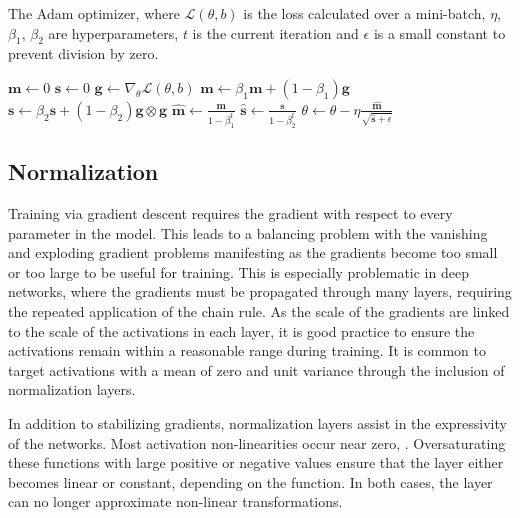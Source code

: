 \begin{algorithm}
\caption{The Adam optimizer, where $\mathcal{L}(\theta, b)$ is the loss calculated over a mini-batch, $\eta$, $\beta_1$, $\beta_2$ are hyperparameters, $t$ is the current iteration and $\epsilon$ is a small constant to prevent division by zero.}
\label{alg:adam}
\begin{algorithmic}[1]
\State $\mathbf{m} \gets 0$ 
\State $\mathbf{s} \gets 0$ 
    \State $\mathbf{g} \gets \nabla_\theta \mathcal{L}(\theta, b)$ 
    \State $\mathbf{m} \gets \beta_1 \mathbf{m} + (1 - \beta_1) \mathbf{g}$ 
    \State $\mathbf{s} \gets \beta_2 \mathbf{s} + (1 - \beta_2) \mathbf{g} \otimes \mathbf{g}$ 
    \State $\hat{\mathbf{m}} \gets \frac{\mathbf{m}}{1 - \beta_1^t}$ 
    \State $\hat{\mathbf{s}} \gets \frac{\mathbf{s}}{1 - \beta_2^t}$ 
    \State $\theta \gets \theta - \eta \frac{\hat{\mathbf{m}}}{\sqrt{\hat{\mathbf{s}} + \epsilon}}$ 
\EndFor
\end{algorithmic}
\end{algorithm}

\subsection{Normalization}

Training via gradient descent requires the gradient with respect to every parameter in the model.
This leads to a balancing problem with the vanishing and exploding gradient problems manifesting as the gradients become too small or too large to be useful for training.
This is especially problematic in deep networks, where the gradients must be propagated through many layers, requiring the repeated application of the chain rule.
As the scale of the gradients are linked to the scale of the activations in each layer, it is good practice to ensure the activations remain within a reasonable range during training.
It is common to target activations with a mean of zero and unit variance through the inclusion of normalization layers.

In addition to stabilizing gradients, normalization layers assist in the expressivity of the networks.
Most activation non-linearities occur near zero, .
Oversaturating these functions with large positive or negative values ensure that the layer either becomes linear or constant, depending on the function.
In both cases, the layer can no longer approximate non-linear transformations.

